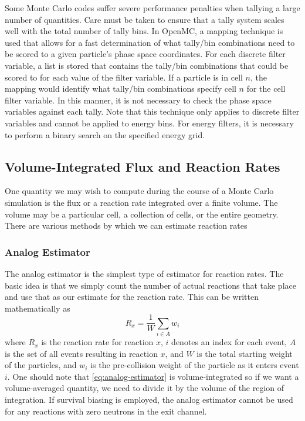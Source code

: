Some Monte Carlo codes suffer severe performance penalties when tallying a large
number of quantities. Care must be taken to ensure that a tally system scales
well with the total number of tally bins. In OpenMC, a mapping technique is used
that allows for a fast determination of what tally/bin combinations need to be
scored to a given particle's phase space coordinates. For each discrete filter
variable, a list is stored that contains the tally/bin combinations that could
be scored to for each value of the filter variable. If a particle is in cell
$n$, the mapping would identify what tally/bin combinations specify cell
$n$ for the cell filter variable. In this manner, it is not necessary to
check the phase space variables against each tally. Note that this technique
only applies to discrete filter variables and cannot be applied to energy
bins. For energy filters, it is necessary to perform a binary search on the
specified energy grid.

\subsection{Volume-Integrated Flux and Reaction Rates}

One quantity we may wish to compute during the course of a Monte Carlo
simulation is the flux or a reaction rate integrated over a finite volume. The
volume may be a particular cell, a collection of cells, or the entire
geometry. There are various methods by which we can estimate reaction rates

\subsubsection{Analog Estimator}

The analog estimator is the simplest type of estimator for reaction rates. The
basic idea is that we simply count the number of actual reactions that take
place and use that as our estimate for the reaction rate. This can be written
mathematically as
\begin{equation}
  \label{eq:analog-estimator}
  R_x = \frac{1}{W} \sum_{i \in A} w_i
\end{equation}
where $R_x$ is the reaction rate for reaction $x$, $i$ denotes an index for each
event, $A$ is the set of all events resulting in reaction $x$, and $W$ is the
total starting weight of the particles, and $w_i$ is the pre-collision weight of
the particle as it enters event $i$. One should note that
\eqref{eq:analog-estimator} is volume-integrated so if we want a volume-averaged
quantity, we need to divide it by the volume of the region of integration. If
survival biasing is employed, the analog estimator cannot be used for any
reactions with zero neutrons in the exit channel.

